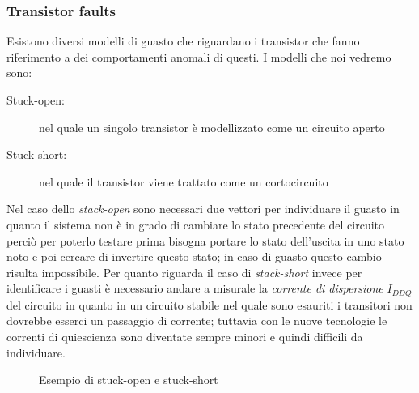 \subsubsection{Transistor faults}
Esistono diversi modelli di guasto che riguardano i transistor che fanno riferimento a dei comportamenti anomali di questi. I modelli che noi vedremo sono:
\begin{description}
\item[Stuck-open:] nel quale un singolo transistor è modellizzato come un circuito aperto
\item[Stuck-short:] nel quale il transistor viene trattato come un cortocircuito
\end{description}
Nel caso dello \emph{stack-open} sono necessari due vettori per individuare il guasto in quanto il sistema non è in grado di cambiare lo stato precedente del circuito perciò per poterlo testare prima bisogna portare lo stato dell'uscita in uno stato noto e poi cercare di invertire questo stato; in caso di guasto questo cambio risulta impossibile. Per quanto riguarda il caso di \emph{stack-short} invece per identificare i guasti è necessario andare a misurale la \emph{corrente di dispersione} $I_{DDQ}$del circuito in quanto in un circuito stabile nel quale sono esauriti i transitori non dovrebbe esserci un passaggio di corrente; tuttavia con le nuove tecnologie le correnti di quiescienza sono diventate sempre minori e quindi difficili da individuare.
\begin{figure}
\centering
{}
\caption{Esempio di stuck-open e stuck-short}
\end{figure}
